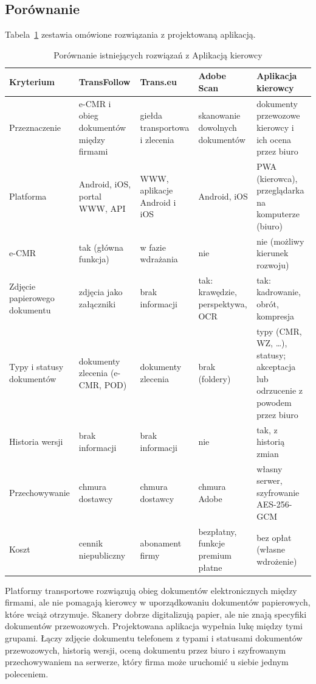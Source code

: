 \subsection{Porównanie}

Tabela~\ref{tab:porownanie} zestawia omówione rozwiązania z projektowaną
aplikacją.

\begin{table}[htbp]
\centering
\caption{Porównanie istniejących rozwiązań z Aplikacją kierowcy}
\label{tab:porownanie}
\footnotesize
\begin{tabular}{|p{}|p{}|p{}|p{}|p{}|}
\hline
\textbf{Kryterium} & \textbf{TransFollow} & \textbf{Trans.eu} & \textbf{Adobe Scan} & \textbf{Aplikacja kierowcy} \\
\hline
Przeznaczenie & e-CMR i obieg dokumentów między firmami & giełda transportowa i zlecenia & skanowanie dowolnych dokumentów & dokumenty przewozowe kierowcy i ich ocena przez biuro \\
\hline
Platforma & Android, iOS, portal WWW, API & WWW, aplikacje Android i iOS & Android, iOS & PWA (kierowca), przeglądarka na komputerze (biuro) \\
\hline
e-CMR & tak (główna funkcja) & w fazie wdrażania & nie & nie (możliwy kierunek rozwoju) \\
\hline
Zdjęcie papierowego dokumentu & zdjęcia jako załączniki & brak informacji & tak: krawędzie, perspektywa, OCR & tak: kadrowanie, obrót, kompresja \\
\hline
Typy i statusy dokumentów & dokumenty zlecenia (e-CMR, POD) & dokumenty zlecenia & brak (foldery) & typy (CMR, WZ, \ldots), statusy; akceptacja lub odrzucenie z powodem przez biuro \\
\hline
Historia wersji & brak informacji & brak informacji & nie & tak, z historią zmian \\
\hline
Przechowywanie & chmura dostawcy & chmura dostawcy & chmura Adobe & własny serwer, szyfrowanie AES-256-GCM \\
\hline
Koszt & cennik niepubliczny & abonament firmy & bezpłatny, funkcje premium płatne & bez opłat (własne wdrożenie) \\
\hline
\end{tabular}
\par
{}
\end{table}

Platformy transportowe rozwiązują obieg dokumentów elektronicznych między
firmami, ale nie pomagają kierowcy w uporządkowaniu dokumentów papierowych,
które wciąż otrzymuje. Skanery dobrze digitalizują papier, ale nie znają
specyfiki dokumentów przewozowych. Projektowana aplikacja wypełnia lukę między
tymi grupami. Łączy zdjęcie dokumentu telefonem z typami i statusami
dokumentów przewozowych, historią wersji, oceną dokumentu przez biuro
i szyfrowanym przechowywaniem na serwerze, który firma może uruchomić u siebie
jednym poleceniem.
